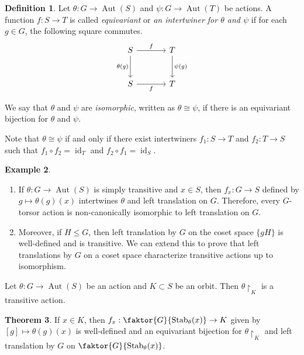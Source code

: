 \documentclass[10pt,letterpaper,cm]{nupset}
\theoremstyle{definition}
\newtheorem{definition}{Definition}[subsection]
\newtheorem{exmp}[definition]{Example}
\theoremstyle{theorem}
\newtheorem{theorem}[definition]{Theorem}
\theoremstyle{remark}
\newcommand{\1}{\mathbf{1}}
\newcommand{\0}{\vec 0}
\DeclareMathOperator{\id}{\mathrm{id}}
\DeclareMathOperator{\aut}{Aut}
\DeclareMathOperator{\stab}{Stab}
\begin{document}
\begin{definition}
Let $\theta : G \to \aut(S)$ and $\psi: G \to \aut(T)$ be actions. A function $f: S \to T$ is called \textit{equivariant} or \textit{an intertwiner for $\theta$ and $\psi$} if for each $g \in G$, the following square commutes.
\[
\begin{tikzcd}[row sep=large, column sep = large]
S \arrow[r, "f"] \arrow[d, "\theta(g)", swap]
& T \arrow[d, "\psi(g)"] \\
S \arrow[r, "f"']
& T
\end{tikzcd}
\]
\end{definition}


We say that $\theta$ and $\psi$ are \textit{isomorphic}, written as $\theta \cong \psi$,  if there is an equivariant bijection for $\theta$ and $\psi$.

Note that  $\theta \cong \psi$ if and only if there exist intertwiners $f_1 : S \to T$ and $f_2 : T \to S$ such that $f_1 \circ f_2 = \id_T$ and $f_2 \circ f_1 = \id_S$. 


\begin{exmp} $ $
\begin{enumerate}
\item If $\theta: G \to \aut(S)$ is simply transitive and $x \in S$, then $f_x: G \to S$ defined by $g \mapsto \theta(g)(x)$ intertwines $\theta$ and left translation on $G$. Therefore, every $G$-torsor action is non-canonically isomorphic to left translation on $G$.
\item Moreover, if $H \leq G$, then left translation by $G$ on the coset space $\{gH\}$ is well-defined and is transitive. We can extend this to prove that left translations by $G$ on a coset space characterize transitive actions up to isomorphism.
\end{enumerate}
\end{exmp}

\smallskip

Let $ \theta: G \to \aut(S)$ be an action and $K \subset S$ be an orbit. Then $\theta \restriction_K$ is a transitive action. 

\begin{theorem}
If $x \in K$, then $f_x: \faktor{G}{\stab_\theta(x)} \to K$ given by $[g] \mapsto \theta(g)(x)$ is well-defined and an equivariant bijection for $\theta \restriction_K$ and left translation by $G$ on $\faktor{G}{\stab_\theta(x)}$.
\end{theorem}
\end{document}
